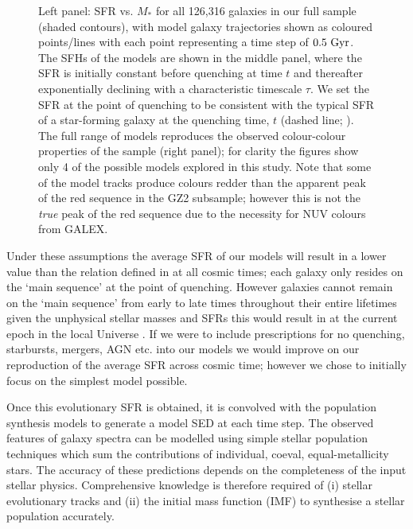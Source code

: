 \begin{figure}
\caption[SFH models in observational planes]{Left panel: SFR vs. $M_*$ for all 126,316 galaxies in our full sample (shaded contours), with model galaxy trajectories shown as coloured points/lines with each point representing a time step of $0.5~\rm{Gyr}$. The SFHs of the models are shown in the middle panel, where the SFR is initially constant before quenching at time $t$ and thereafter exponentially declining with a characteristic timescale $\tau$. We set the SFR at the point of quenching to be consistent with the typical SFR of a star-forming galaxy at the quenching time, $t$ (dashed line; \citealt{peng10}). The full range of models reproduces the observed colour-colour properties of the sample (right panel); for clarity the figures show only 4 of the possible models explored in this study. Note that some of the model tracks produce colours redder than the apparent peak of the red sequence in the GZ2 subsample; however this is not the \emph{true} peak of the red sequence due to the necessity for NUV colours from GALEX.}
\label{sfr_mass_col}
\end{figure}
  
Under these assumptions the average SFR of our models will result in a lower value than the relation defined in \citet{peng10} at all cosmic times; each galaxy only resides on the `main sequence' at the point of quenching. However galaxies cannot remain on the `main sequence' from early to late times throughout their entire lifetimes given the unphysical stellar masses and SFRs this would result in at the current epoch in the local Universe \citep{bethermin12, Heinis14}. If we were to include prescriptions for no quenching, starbursts, mergers, AGN etc. into our models we would improve on our reproduction of the average SFR across cosmic time; however we chose to initially focus on the simplest model possible.

Once this evolutionary SFR is obtained, it is convolved with the \citet{BC03} population synthesis models to generate a model SED at each time step. The observed features of galaxy spectra can be modelled using simple stellar population techniques which sum the contributions of individual, coeval, equal-metallicity stars. The accuracy of these predictions depends on the completeness of the input stellar physics. Comprehensive knowledge is therefore required of (i) stellar evolutionary tracks and (ii) the initial mass function (IMF) to synthesise a stellar population accurately. 

